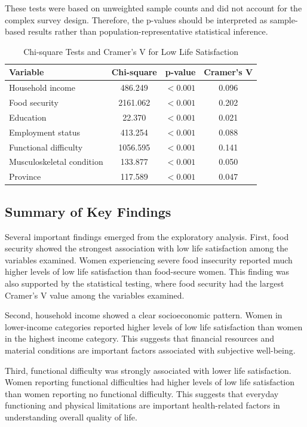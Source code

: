 \documentclass[12pt]{article}
\begin{document}
These tests were based on unweighted sample counts and did not account
for the complex survey design. Therefore, the p-values should be
interpreted as sample-based results rather than population-representative
statistical inference.

\begin{table}[H]
\centering
\caption{Chi-square Tests and Cramer's V for Low Life Satisfaction}
\begin{tabular}{lccc}
\hline
Variable & Chi-square & p-value & Cramer's V \\
\hline
Household income & 486.249 & $<0.001$ & 0.096 \\
Food security & 2161.062 & $<0.001$ & 0.202 \\
Education & 22.370 & $<0.001$ & 0.021 \\
Employment status & 413.254 & $<0.001$ & 0.088 \\
Functional difficulty & 1056.595 & $<0.001$ & 0.141 \\
Musculoskeletal condition & 133.877 & $<0.001$ & 0.050 \\
Province & 117.589 & $<0.001$ & 0.047 \\
\hline
\end{tabular}
\label{tab:chi_square_cramers_v}
\end{table}

\subsection{Summary of Key Findings}

Several important findings emerged from the exploratory analysis. First, food security showed the strongest association with low life satisfaction among the variables examined. Women experiencing severe food insecurity reported much higher levels of low life satisfaction than food-secure women. This finding was also supported by the statistical testing, where food security had the largest Cramer's V value among the variables examined.

Second, household income showed a clear socioeconomic pattern. Women in lower-income categories reported higher levels of low life satisfaction than women in the highest income category. This suggests that financial resources and material conditions are important factors associated with subjective well-being.

Third, functional difficulty was strongly associated with lower life satisfaction. Women reporting functional difficulties had higher levels of low life satisfaction than women reporting no functional difficulty. This suggests that everyday functioning and physical limitations are important health-related factors in understanding overall quality of life.
\end{document}

